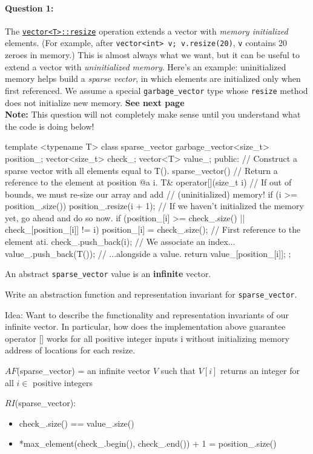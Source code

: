 \documentclass[12pt,letterpaper,twoside]{article}
\begin{document}
\paragraph{Question 1: } The \href{https://en.cppreference.com/w/cpp/container/vector/resize}{\texttt{vector<T>::resize}} 
operation extends a vector with \emph{memory initialized} elements. (For example, after \texttt{vector<int> v; v.resize(20)}, \texttt{v} 
contains 20 zeroes in memory.) This is almost always what we want, but it can be useful to extend a vector with \emph{uninitialized
  memory}. Here's an example: uninitialized memory helps build a \emph{sparse
  vector}, in which elements are initialized only when first referenced. We
assume a special \texttt{garbage\_vector} type whose \texttt{resize} method does
not initialize new memory. \textbf{See next page}\\ \textbf{Note:} This question will
not completely make sense until you understand what the code is doing below!

\newpage
\begin{cpp}
template <typename T> 
class sparse_vector {
garbage_vector<size_t> position_;
vector<size_t> check_;
vector<T> value_;
public:
// Construct a sparse vector with all elements equal to T().
sparse_vector() {}
// Return a reference to the element at position @a i.
T& operator[](size_t i) {
    // If out of bounds, we must re-size our array and add 
    // (uninitialized) memory!
    if (i >= position_.size())
    position_.resize(i + 1);
    // If we haven't initialized the memory yet, go ahead and do so now.
    if (position_[i] >= check_.size() || check_[position_[i]] != i) {
    position_[i] = check_.size(); // First reference to the element ati.
    check_.push_back(i);          // We associate an index...
    value_.push_back(T());        // ...alongside a value.
    }
    return value_[position_[i]];
}
};
\end{cpp}

An abstract \texttt{sparse\_vector} value is an \textbf{infinite} vector.

Write an abstraction function and representation invariant for
\texttt{sparse\_vector}.

{\color{purple}Idea: Want to describe the functionality and representation invariants
of our infinite vector. In particular, how does the implementation above guarantee operator 
[] works for all positive integer inputs i without initializing memory address of locations
for each resize. 

$AF$(sparse\_vector) = an infinite vector $V$ such that $V[i]$ returns an integer 
for all $i \in $ positive integers

$RI$(sparse\_vector): 
\begin{itemize}
    \item check\_.size() == value\_.size()
    \item *max\_element(check\_.begin(), check\_.end()) + 1 = position\_.size()
\end{itemize}

}
\end{document}
